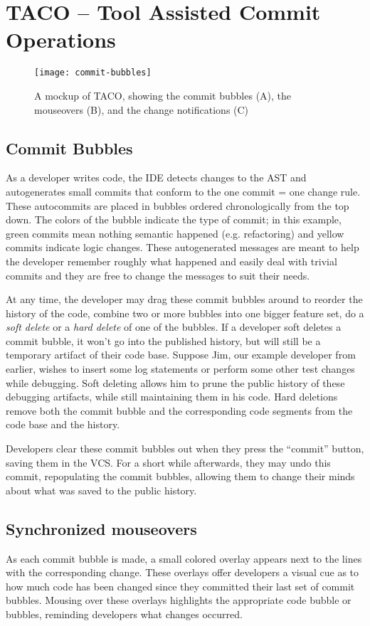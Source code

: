 \documentclass[conference]{IEEEtran}
\begin{document}
\section{TACO -- Tool Assisted Commit Operations}
\begin{figure}
\centering
\texttt{[image: commit-bubbles]}
\caption{A mockup of TACO, showing the commit bubbles (A), the mouseovers (B),
and the change notifications (C)}
\label{fig:eclipse}
\end{figure}
\subsection{Commit Bubbles}
As a developer writes code, the IDE detects changes to the AST and autogenerates small commits
that conform to the one commit = one change rule.
These autocommits are placed in bubbles ordered chronologically from the top down.
The colors of the bubble indicate the type of commit; in this example, green commits mean nothing
semantic happened (e.g. refactoring) and yellow commits indicate logic changes.
These autogenerated messages are meant to help the developer remember roughly what happened and
easily deal with trivial commits and they are free to change the messages to suit their needs.

At any time, the developer may drag these commit bubbles around to reorder the history of the code,
combine two or more bubbles into one bigger feature set, do a \textit{soft delete}
or a \textit{hard delete} of one of the bubbles.
If a developer soft deletes a commit bubble, it won't go into the published history, but will still be a temporary artifact of their code base.
Suppose Jim, our example developer from earlier, wishes to insert some log statements or perform
some other test changes while debugging.  
Soft deleting allows him to prune the public history of these debugging artifacts, while still maintaining them in his code.
Hard deletions remove both the commit bubble and the corresponding code segments from the code base and the history. 

Developers clear these commit bubbles out when they press the ``commit'' button, saving them in the VCS.  
For a short while afterwards, they may undo this commit, repopulating the commit bubbles, allowing them to change their minds about what was saved to the public history.
\subsection{Synchronized mouseovers}
As each commit bubble is made, a small colored overlay appears next to the lines with the corresponding change.
These overlays offer developers a visual cue as to how much code has been changed since they 
committed their last set of commit bubbles.
Mousing over these overlays highlights the appropriate code bubble or bubbles,
reminding developers what changes occurred.
\end{document}
